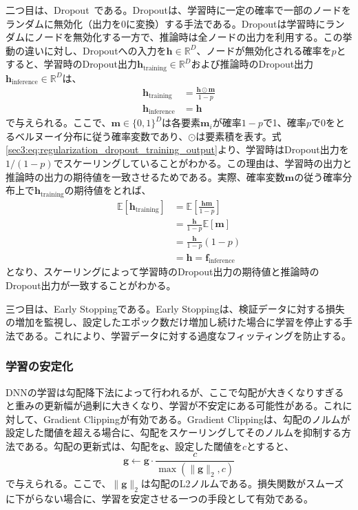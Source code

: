 \documentclass[12pt]{jarticle}
\numberwithin{equation}{section}    %
\numberwithin{figure}{section}      %
\numberwithin{table}{section}      %
\begin{document}
二つ目は、Dropout~\cite{srivastava2014dropout}である。Dropoutは、学習時に一定の確率で一部のノードをランダムに無効化（出力を0に変換）する手法である。Dropoutは学習時にランダムにノードを無効化する一方で、推論時は全ノードの出力を利用する。この挙動の違いに対し、Dropoutへの入力を$\bm{h} \in \mathbb{R}^{D}$、ノードが無効化される確率を$p$とすると、学習時のDropout出力$\bm{h}_{\text{training}} \in \mathbb{R}^{D}$および推論時のDropout出力$\bm{h}_{\text{inference}} \in \mathbb{R}^{D}$は、
\begin{align}
    \bm{h}_{\text{training}}  & = \frac{\bm{h} \odot \bm{m}}{1 - p} \label{sec3:eq:regularization_dropout_training_output} \\
    \bm{h}_{\text{inference}} & = \bm{h}
\end{align}
で与えられる。ここで、$\bm{m} \in \{0, 1\}^{D}$は各要素$\bm{m}_{i}$が確率$1 - p$で1、確率$p$で0をとるベルヌーイ分布に従う確率変数であり、$\odot$は要素積を表す。式\eqref{sec3:eq:regularization_dropout_training_output}より、学習時はDropout出力を$1 / (1 - p)$でスケーリングしていることがわかる。この理由は、学習時の出力と推論時の出力の期待値を一致させるためである。実際、確率変数$\bm{m}$の従う確率分布上で$\bm{h}_{\text{training}}$の期待値をとれば、
\begin{align}
    \mathbb{E}[\bm{h}_{\text{training}}] & = \mathbb{E} \left[ \frac{\bm{h}\bm{m}}{1 - p} \right] \\
                                         & = \frac{\bm{h}}{1 - p} \mathbb{E}[\bm{m}]              \\
                                         & = \frac{\bm{h}}{1 - p} (1 - p)                         \\
                                         & = \bm{h} = \bm{f}_{\text{inference}}
\end{align}
となり、スケーリングによって学習時のDropout出力の期待値と推論時のDropout出力が一致することがわかる。

三つ目は、Early Stoppingである。Early Stoppingは、検証データに対する損失の増加を監視し、設定したエポック数だけ増加し続けた場合に学習を停止する手法である。これにより、学習データに対する過度なフィッティングを防止する。

\subsubsection{学習の安定化}
DNNの学習は勾配降下法によって行われるが、ここで勾配が大きくなりすぎると重みの更新幅が過剰に大きくなり、学習が不安定にある可能性がある。これに対して、Gradient Clippingが有効である。Gradient Clippingは、勾配のノルムが設定した閾値を超える場合に、勾配をスケーリングしてそのノルムを抑制する方法である。勾配の更新式は、勾配を$\bm{g}$、設定した閾値を$c$とすると、
\begin{equation}
    \bm{g} \gets \bm{g} \cdot \frac{c}{\max (\|\bm{g}\|_{2}, c)}
\end{equation}
で与えられる。ここで、$\|\bm{g}\|_{2}$は勾配のL2ノルムである。損失関数がスムーズに下がらない場合に、学習を安定させる一つの手段として有効である。
\end{document}
